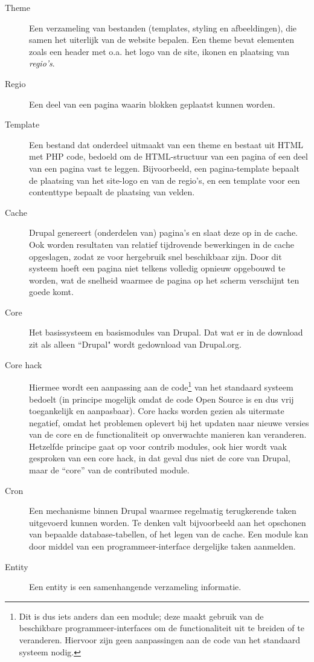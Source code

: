 \begin{description}
\item[Theme] Een verzameling van bestanden (templates, styling en 
afbeeldingen), die samen het uiterlijk van de website bepalen. Een theme bevat 
elementen zoals een header met o.a. het logo van de site, ikonen en plaatsing 
van \emph{regio's}.
\item[Regio] Een deel van een pagina waarin blokken geplaatst kunnen worden. 
\item[Template] Een bestand dat onderdeel uitmaakt van een theme en bestaat uit 
HTML met PHP code, bedoeld om de HTML-structuur van een pagina of een deel van 
een pagina vast te leggen. Bijvoorbeeld, een pagina-template bepaalt de 
plaatsing van het site-logo en van de regio's, en een template voor een 
contenttype bepaalt de plaatsing van velden.
\item[Cache] Drupal genereert (onderdelen van) pagina's en slaat deze op in de 
cache. Ook worden resultaten van relatief tijdrovende bewerkingen in de cache 
opgeslagen, zodat ze voor hergebruik snel beschikbaar zijn. Door dit systeem 
hoeft een pagina niet telkens volledig opnieuw opgebouwd te worden, wat de 
snelheid waarmee de pagina op het scherm verschijnt ten goede komt. 
\item[Core] Het basissysteem en basismodules van Drupal. Dat wat er in de 
download zit als alleen ``Drupal" wordt gedownload van Drupal.org. 
\item[Core hack] Hiermee wordt een aanpassing aan de code\footnote{Dit is dus 
iets anders dan een module; deze maakt gebruik van de beschikbare 
programmeer-interfaces om de functionaliteit uit te breiden of te veranderen. 
Hiervoor zijn geen aanpassingen aan de code van het standaard systeem nodig.} 
van het standaard systeem bedoelt (in principe mogelijk omdat de code Open 
Source is en dus vrij toegankelijk en aanpasbaar). Core hacks worden gezien als 
uitermate negatief, omdat het problemen oplevert bij het updaten naar nieuwe 
versies van de core en de functionaliteit op onverwachte manieren kan 
veranderen. Hetzelfde principe gaat op voor contrib modules, ook hier wordt 
vaak gesproken van een core hack, in dat geval dus niet de core van Drupal, maar 
de ``core'' van de contributed module.
\item[Cron] Een mechanisme binnen Drupal waarmee regelmatig terugkerende taken 
uitgevoerd kunnen worden. Te denken valt bijvoorbeeld aan het opschonen van 
bepaalde database-tabellen, of het legen van de cache. Een module kan door 
middel van een programmeer-interface dergelijke taken aanmelden.
\item[Entity] Een entity is een samenhangende verzameling informatie. 

\end{description}
